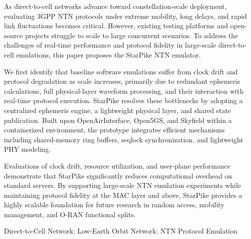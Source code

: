 As direct-to-cell networks advance toward constellation-scale deployment,
evaluating 3GPP NTN protocols under extreme mobility, long delays, and rapid link fluctuations becomes critical.
However, existing testing platforms and open-source projects struggle to scale to large concurrent scenarios.
To address the challenges of real-time performance and protocol fidelity in large-scale direct-to-cell emulations,
this paper proposes the StarPike NTN emulator.

We first identify that baseline software emulations suffer from clock drift and protocol degradation as scale increases,
primarily due to redundant ephemeris calculations, full physical-layer waveform processing, 
and their interaction with real-time protocol execution.
StarPike resolves these bottlenecks by adopting a centralized ephemeris engine, a lightweight physical layer, 
and shared state publication.
Built upon OpenAirInterface, Open5GS, and Skyfield within a containerized environment, 
the prototype integrates efficient mechanisms including shared-memory ring buffers, seqlock synchronization, 
and lightweight PHY modeling.

Evaluations of clock drift, resource utilization, and user-plane performance demonstrate that 
StarPike significantly reduces computational overhead on standard servers. 
By supporting large-scale NTN emulation experiments while maintaining protocol fidelity at the MAC layer and above,
StarPike provides a highly scalable foundation for future research in random access, mobility management, and O-RAN functional splits.

\vspace{\baselineskip}
 Direct-to-Cell Network; Low-Earth Orbit Network; NTN Protocol Emulation

\titlespacing{\chapter}{0pt}{-6mm}{5mm}
\clearpage{\pagestyle{empty}\cleardoublepage}

